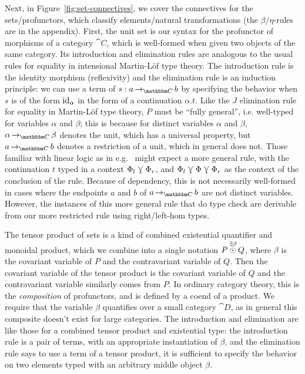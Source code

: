\documentclass{llncs}
\begin{document}
Next, in Figure~\ref{fig:set-connectives}, we cover the connectives for
the sets/profunctors, which classify elements/natural transformations
(the $\beta/\eta$-rules are in the appendix).
First, the unit set is our syntax for the profunctor of morphisms of a
category $\cat C$, which is well-formed when given two objects of the
same category.  
%
Its introduction and elimination rules are analogous to the usual rules
for equality in intensional Martin-L\"of type theory.  The introduction
rule is the identity morphism (reflexivity) and the elimination rule is
an induction principle: we can use a term of $s : \punitinXfromYtoZ
{\cat C} a b$ by specifying the behavior when $s$ is of the form
$\textrm{id}_{\alpha}$ in the form of a continuation $\alpha. t$.  Like the
$J$ elimination rule for equality in Martin-L\"of type theory, $P$ must
be ``fully general'', i.e. well-typed for variables $\alpha$ and
$\beta$; this is because for distinct variables $\alpha$ and $\beta$,
$\punitinXfromYtoZ{\cat C}{\alpha}{\beta}$ denotes the unit, which has a
universal property, but $\punitinXfromYtoZ{\cat C} a b$ denotes a
restriction of a unit, which in general does not.  Those familiar with
linear logic as in e.g.~\cite{polakow-pfenning} might expect a more
general rule, with the continuation $t$ typed in a context $\Phi_l
\curlyveedownarrow \Phi_r$, and $\Phi_l \curlyveedownarrow \Phi \curlyveedownarrow \Phi_r$ as the context of
the conclusion of the rule.  Because of dependency, this is not
necessarily well-formed in cases where the endpoints $a$ and $b$ of
$\punitinXfromYtoZ{\cat C} a b$ are not distinct variables.  However,
the instances of this more general rule that do type check are derivable
from our more restricted rule using right/left-hom types.

The tensor product of sets is a kind of combined existential quantifier
and monoidal product, which we combine into a single notation
$P \mathop{\overset{\exists \beta}\odot} Q$, where $\beta$ is the covariant
variable of $P$ and the contravariant variable of $Q$. Then the
covariant variable of the tensor product is the covariant variable of
$Q$ and the contravariant variable similarly comes from $P$.
%
In ordinary category theory, this is the \emph{composition} of
profunctors, and is defined by a coend of a product. We require that
the variable $\beta$ quantifies over a small category $\cat D$, as in
general this composite doesn't exist for large categories.
%
The introduction and elimination are like those for a combined tensor
product and existential type: the introduction rule is a pair of
terms, with an appropriate instantiation of $\beta$, and the
elimination rule says to use a term of a tensor product, it is
sufficient to specify the behavior on two elements typed with an
arbitrary middle object $\beta$.
\end{document}
